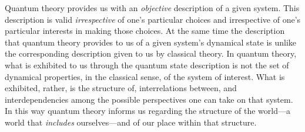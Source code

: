 Quantum theory provides us with an \emph{objective} description of a given system. This description is valid \emph{irrespective} of one's particular choices and irrespective of one's particular interests in making those choices. At the same time the description that quantum theory provides to us of a given system's dynamical state is unlike the corresponding description given to us by classical theory. In quantum theory, what is exhibited to us through the quantum state description is not the set of dynamical properties, in the classical sense, of the system of interest. What is exhibited, rather, is the structure of, interrelations between, and interdependencies among the possible perspectives one can take on that system. In this way quantum theory informs us regarding the structure of the world---a world that \emph{includes} ourselves---and of our place within that structure.
